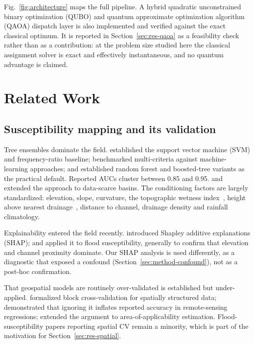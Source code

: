 \documentclass[10pt,twocolumn]{article}
\begin{document}
Fig.~\ref{fig:architecture} maps the full pipeline. A hybrid quadratic
unconstrained binary optimization (QUBO) and quantum approximate optimization
algorithm (QAOA) dispatch layer is also implemented and verified against the
exact classical optimum. It is reported in Section~\ref{sec:res-qaoa} as a
feasibility check rather than as a contribution: at the problem size studied
here the classical assignment solver is exact and effectively instantaneous,
and no quantum advantage is claimed.

\section{Related Work}
\label{sec:related}

\subsection{Susceptibility mapping and its validation}
Tree ensembles dominate the field. \citet{tehrany2014} established the support vector machine (SVM) and frequency-ratio baseline; \citet{khosravi2018} benchmarked multi-criteria
against machine-learning approaches; \citet{arabameri2019} and \citet{saha2021}
established random forest and boosted-tree variants as the practical default.
Reported AUCs cluster between 0.85 and 0.95. \citet{wang2020} and
\citet{avand2021} extended the approach to data-scarce basins.
The conditioning factors are largely standardized: elevation, slope, curvature,
the topographic wetness index~\citep{beven1979}, height above nearest
drainage~\citep{renno2008,nobre2011}, distance to channel, drainage density and
rainfall climatology.

Explainability entered the field recently. \citet{lundberg2017} introduced Shapley additive explanations (SHAP);
\citet{aydin2022} and \citet{seydi2023} applied it to flood susceptibility,
generally to confirm that elevation and channel proximity dominate. Our SHAP
analysis is used differently, as a diagnostic that exposed a confound
(Section~\ref{sec:method-confound}), not as a post-hoc confirmation.

That geospatial models are routinely over-validated is established but
under-applied. \citet{roberts2017} formalized block cross-validation for
spatially structured data; \citet{ploton2020} demonstrated that ignoring it
inflates reported accuracy in remote-sensing regressions; \citet{meyer2021}
extended the argument to area-of-applicability estimation. Flood-susceptibility
papers reporting spatial CV remain a minority, which is part of the motivation
for Section~\ref{sec:res-spatial}.
\end{document}
